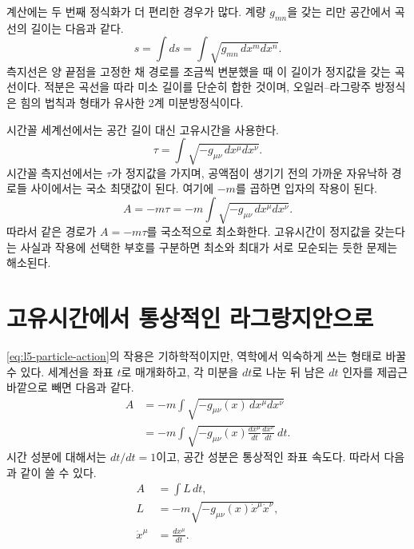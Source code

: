 계산에는 두 번째 정식화가 더 편리한 경우가 많다. 계량 \(g_{mn}\)을 갖는 리만 공간에서 곡선의 길이는 다음과 같다.
\begin{equation}
s=\int ds
=\int\sqrt{g_{mn}\,dx^m dx^n}.
\label{eq:l5-spatial-length}
\end{equation}
측지선은 양 끝점을 고정한 채 경로를 조금씩 변분했을 때 이 길이가 정지값을 갖는 곡선이다. 적분은 곡선을 따라 미소 길이를 단순히 합한 것이며, 오일러--라그랑주 방정식은 힘의 법칙과 형태가 유사한 2계 미분방정식이다.

시간꼴 세계선에서는 공간 길이 대신 고유시간을 사용한다.
\begin{equation}
\tau
=\int\sqrt{-g_{\mu\nu}\,dx^\mu dx^\nu}.
\label{eq:l5-proper-time-functional}
\end{equation}
시간꼴 측지선에서는 \(\tau\)가 정지값을 가지며, 공액점이 생기기 전의 가까운 자유낙하 경로들 사이에서는 국소 최댓값이 된다. 여기에 \(-m\)를 곱하면 입자의 작용이 된다.
\begin{equation}
A=-m\tau
=-m\int\sqrt{-g_{\mu\nu}\,dx^\mu dx^\nu}.
\label{eq:l5-particle-action}
\end{equation}
따라서 같은 경로가 \(A=-m\tau\)를 국소적으로 최소화한다. 고유시간이 정지값을 갖는다는 사실과 작용에 선택한 부호를 구분하면 최소와 최대가 서로 모순되는 듯한 문제는 해소된다.

\section{고유시간에서 통상적인 라그랑지안으로}

\eqref{eq:l5-particle-action}의 작용은 기하학적이지만, 역학에서 익숙하게 쓰는 형태로 바꿀 수 있다. 세계선을 좌표 \(t\)로 매개화하고, 각 미분을 \(dt\)로 나눈 뒤 남은 \(dt\) 인자를 제곱근 바깥으로 빼면 다음과 같다.
\begin{align}
A
&=-m\int\sqrt{-g_{\mu\nu}(x)\,dx^\mu dx^\nu}\\
&=-m\int
\sqrt{-g_{\mu\nu}(x)
\frac{dx^\mu}{dt}\frac{dx^\nu}{dt}}\,dt.
\label{eq:l5-action-t}
\end{align}
시간 성분에 대해서는 \(dt/dt=1\)이고, 공간 성분은 통상적인 좌표 속도다. 따라서 다음과 같이 쓸 수 있다.
\begin{equation}
\begin{aligned}
A&=\int L\,dt,\\
L&=-m\sqrt{-g_{\mu\nu}(x)\dot x^\mu\dot x^\nu},\\
\dot x^\mu&=\frac{dx^\mu}{dt}.
\end{aligned}
\label{eq:l5-relativistic-lagrangian}
\end{equation}

